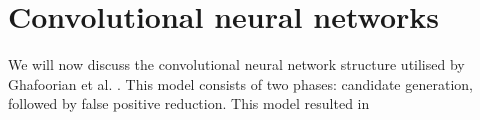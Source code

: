 %
%
%
%
%
%


\section{Convolutional neural networks}\label{litrev-cnn}

We will now discuss the convolutional neural network structure utilised by Ghafoorian et al. \cite{GhafoorianM.2017Dml3}. This model consists of two phases: candidate generation, followed by false positive reduction. This model resulted in 

